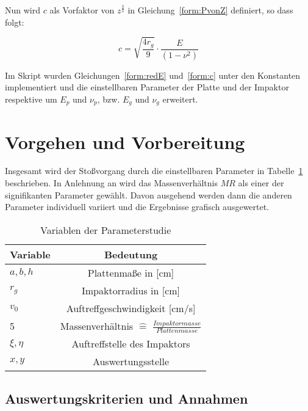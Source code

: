 Nun wird $c$ als Vorfaktor von $z^{\frac{3}{2}}$ in Gleichung~\ref{form:PvonZ} definiert, so dass folgt:

\begin{equation}
	\label{form:c}
	c = \sqrt{\frac{4 r_{g}}{9}} \cdot \frac{E}{(1 - \nu^{2})}
\end{equation}

Im Skript wurden Gleichungen~\ref{form:redE} und~\ref{form:c} unter den Konstanten implementiert und die einstellbaren Parameter der Platte und der Impaktor respektive um $E_{p}$ und $\nu_{p}$, bzw. $E_{g}$ und $\nu_{g}$ erweitert.\\

\section{Vorgehen und Vorbereitung}

Insgesamt wird der Stoßvorgang durch die einstellbaren Parameter in Tabelle~\ref{tab:VariablenderStudie} beschrieben. In Anlehnung an \cite{Olsson.2000} wird das Massenverhältnis $MR$ als einer der signifikanten Parameter gewählt. Davon ausgehend werden dann die anderen Parameter individuell variiert und die Ergebnisse grafisch ausgewertet. 

\begin{table}[H]
	\begin{center}
		\caption{Variablen der Parameterstudie}
		\label{tab:VariablenderStudie}
		\begin{tabular}{l|c}
			\textbf{Variable} & \textbf{Bedeutung}\\
			\hline
			$a,b,h$ & Plattenmaße in [cm]\\
			$r_{g}$ & Impaktorradius in [cm]\\
			$v_{0}$ & Auftreffgeschwindigkeit [cm/s]\\
			5 & Massenverhältnis $\hat{=}$ $\frac{Impaktormasse}{Plattenmasse}$\\
			$\xi,\eta$ & Auftreffstelle des Impaktors\\
			$x,y$ & Auswertungsstelle\\		
		\end{tabular}
	\end{center}
\end{table}

\subsection*{Auswertungskriterien und Annahmen}

